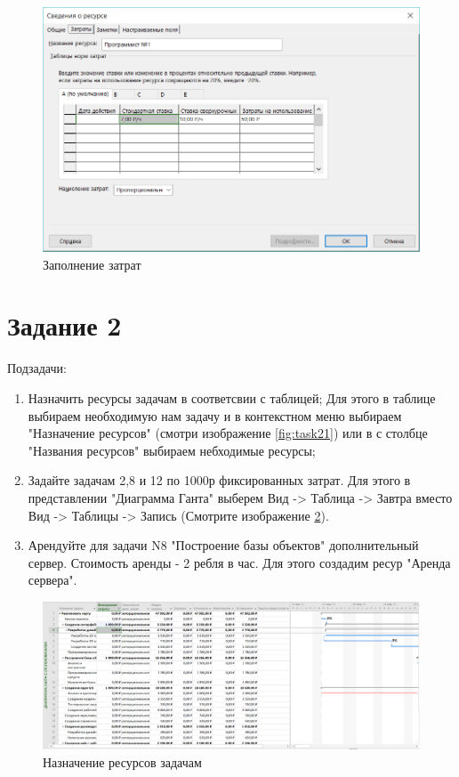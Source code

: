 \begin{figure}[H]
	\centering
	\includegraphics[width=0.7\linewidth]{src/task1_3}
	\caption{Заполнение затрат}
	\label{fig:task13}
\end{figure}

\section{Задание 2}
Подзадачи:
\begin{enumerate}
	\item Назначить ресурсы задачам в соответсвии с таблицей;
	Для этого в таблице выбираем необходимую нам задачу и в контекстном меню выбираем "Назначение ресурсов" (смотри изображение \ref{fig:task21}) или в с столбце "Названия ресурсов" выбираем небходимые ресурсы;
	\item Задайте задачам 2,8 и 12 по 1000р фиксированных затрат. Для этого в представлении "Диаграмма Ганта" выберем Вид -> Таблица -> Завтра вместо Вид -> Таблицы -> Запись (Смотрите изображение \ref{fig:task35}).
	\item Арендуйте для задачи N8 "Построение базы объектов" дополнительный сервер. Стоимость аренды - 2 ребля в час. Для этого создадим ресур "Аренда сервера".
\end{enumerate}

\begin{figure}[H]
	\centering
	\includegraphics[width=0.7\linewidth]{src/task3_5}
	\caption{Назначение ресурсов задачам}
	\label{fig:task35}
\end{figure}


